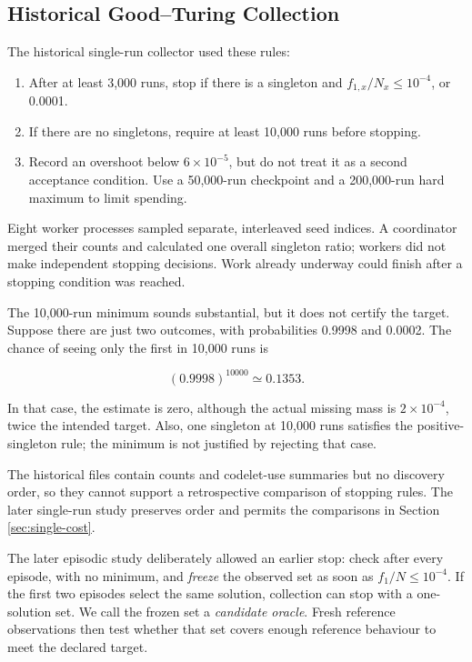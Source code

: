 \documentclass[10pt,letterpaper]{article}
\newcommand{\tightlist}{\setlength{\itemsep}{0pt}\setlength{\parskip}{0pt}}
\begin{document}
\subsection{Historical Good--Turing Collection}\label{sec:stopping}

The historical single-run collector used these rules:

\begin{enumerate}
\def\labelenumi{\arabic{enumi}.}
\tightlist
\item
  After at least 3,000 runs, stop if there is a singleton and \(f_{1,x}/N_x\le10^{-4}\),
  or 0.0001.
\item
  If there are no singletons, require at least 10,000 runs before stopping.
\item
  Record an overshoot below \(6\times10^{-5}\), but do not treat it as a second acceptance
  condition. Use a 50,000-run checkpoint and a 200,000-run hard maximum to limit spending.
\end{enumerate}

Eight worker processes sampled separate, interleaved seed indices. A coordinator merged
their counts and calculated one overall singleton ratio; workers did not make independent
stopping decisions. Work already underway could finish after a stopping condition was
reached.

The 10,000-run minimum sounds substantial, but it does not certify the target. Suppose
there are just two outcomes, with probabilities 0.9998 and 0.0002. The chance of seeing
only the first in 10,000 runs is

\[
(0.9998)^{10000}\simeq0.1353.
\]

In that case, the estimate is zero, although the actual missing mass is
\(2\times10^{-4}\), twice the intended target. Also, one singleton at 10,000 runs
satisfies the positive-singleton rule; the minimum is not justified by rejecting that
case.

The historical files contain counts and codelet-use summaries but no discovery order, so
they cannot support a retrospective comparison of stopping rules. The later single-run
study preserves order and permits the comparisons in Section \ref{sec:single-cost}.

The later episodic study deliberately allowed an earlier stop: check after every episode,
with no minimum, and \emph{freeze} the observed set as soon as \(f_1/N\le10^{-4}\). If the
first two episodes select the same solution, collection can stop with a one-solution set.
We call the frozen set a \emph{candidate oracle}. Fresh reference observations then test
whether that set covers enough reference behaviour to meet the declared target.
\end{document}

